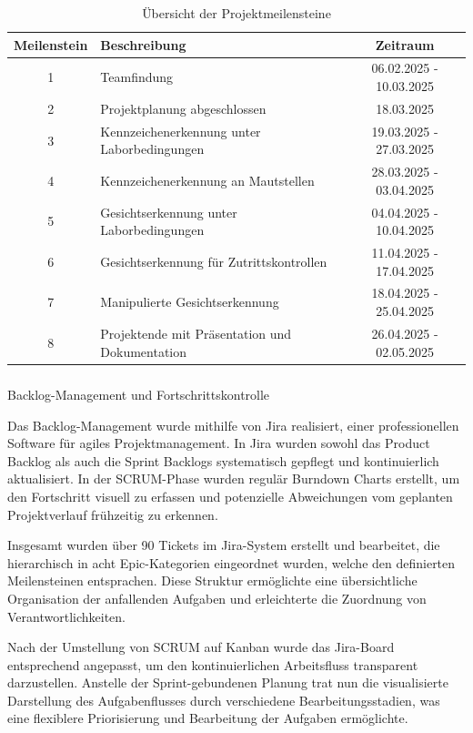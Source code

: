 \begin{table}[h]
    \centering
    \begin{tabular}{|c|l|c|}
        \hline
        \textbf{Meilenstein} & \textbf{Beschreibung} & \textbf{Zeitraum} \\
        \hline
        1 & Teamfindung & 06.02.2025 - 10.03.2025 \\
        \hline
        2 & Projektplanung abgeschlossen & 18.03.2025 \\
        \hline
        3 & Kennzeichenerkennung unter Laborbedingungen & 19.03.2025 - 27.03.2025 \\
        \hline
        4 & Kennzeichenerkennung an Mautstellen & 28.03.2025 - 03.04.2025 \\
        \hline
        5 & Gesichtserkennung unter Laborbedingungen & 04.04.2025 - 10.04.2025 \\
        \hline
        6 & Gesichtserkennung für Zutrittskontrollen & 11.04.2025 - 17.04.2025 \\
        \hline
        7 & Manipulierte Gesichtserkennung & 18.04.2025 - 25.04.2025 \\
        \hline
        8 & Projektende mit Präsentation und Dokumentation & 26.04.2025 - 02.05.2025 \\
        \hline
    \end{tabular}
    \caption{Übersicht der Projektmeilensteine}
    \label{tab:milestones}
\end{table}

\subparagraph{}{Backlog-Management und Fortschrittskontrolle}

Das Backlog-Management wurde mithilfe von Jira realisiert, einer professionellen Software für agiles Projektmanagement. In Jira wurden sowohl das Product Backlog als auch die Sprint Backlogs systematisch gepflegt und kontinuierlich aktualisiert. In der SCRUM-Phase wurden regulär Burndown Charts erstellt, um den Fortschritt visuell zu erfassen und potenzielle Abweichungen vom geplanten Projektverlauf frühzeitig zu erkennen.

Insgesamt wurden über 90 Tickets im Jira-System erstellt und bearbeitet, die hierarchisch in acht Epic-Kategorien eingeordnet wurden, welche den definierten Meilensteinen entsprachen. Diese Struktur ermöglichte eine übersichtliche Organisation der anfallenden Aufgaben und erleichterte die Zuordnung von Verantwortlichkeiten.

Nach der Umstellung von SCRUM auf Kanban wurde das Jira-Board entsprechend angepasst, um den kontinuierlichen Arbeitsfluss transparent darzustellen. Anstelle der Sprint-gebundenen Planung trat nun die visualisierte Darstellung des Aufgabenflusses durch verschiedene Bearbeitungsstadien, was eine flexiblere Priorisierung und Bearbeitung der Aufgaben ermöglichte.


